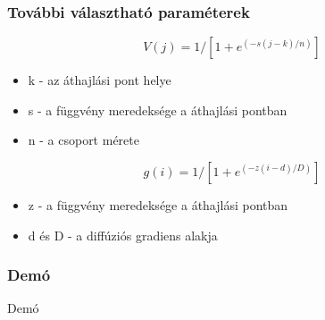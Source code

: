 \begin{frame}
	\frametitle{További választható paraméterek}
	\begin{block}{}
		\begin{equation}
		V(j) = 1/[1 + e^{(-s(j-k)/n)}]
		\end{equation}
		\begin{itemize}
			\item k - az áthajlási pont helye
			\item s - a függvény meredeksége a áthajlási pontban
			\item n - a csoport mérete
		\end{itemize}
	\end{block}
	\begin{block}{}
		\begin{equation}
		g(i) = 1/[1 + e^{(-z(i-d)/D)}]
		\end{equation}
		\begin{itemize}
			\item z - a függvény meredeksége a áthajlási pontban
			\item d és D - a diffúziós gradiens alakja
		\end{itemize}
	\end{block}
\end{frame}

\begin{frame}
	\frametitle{Demó}
	\Huge{\centerline{Demó}}
\end{frame}